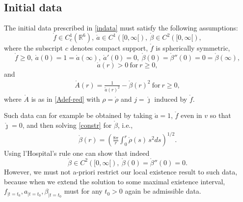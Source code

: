 \documentclass[11pt]{article}
\def\R{\mathbb R}
\begin{document}
\subsection{Initial data}\label{data}
%
%
The initial data prescribed in \eqref{indata} must satisfy the following
assumptions:
\[
\mathring{f} \in C^1_c (\R^6),\ 
\mathring{a}\in C^1([0,\infty[),\
\mathring{\beta}\in C^2([0,\infty[),
\]
where the subscript $c$ denotes compact support, $\mathring{f}$
is spherically symmetric,
\[
\mathring{f} \geq 0,\
\mathring{a}(0) = 1 = \mathring{a}(\infty),\  
\mathring{a}'(0) = 0,\
\mathring{\beta}(0) = \mathring{\beta}''(0) = 0 = \mathring{\beta}(\infty),
\]
\[
\mathring{a}(r) > 0\ \mbox{for}\ r\geq 0,
\]
and
\begin{align} \label{constr}
\mathring{A}(r)=\frac{1}{\mathring{a}(r)^2} -\mathring{\beta}(r)^2
\ \mbox{for}\ r\geq 0,
\end{align}
where $\mathring{A}$ is as in \eqref{Adef-red} with
$\rho=\mathring{\rho}$ and $j=\mathring{\jmath}$ induced by $\mathring{f}$.
%
\begin{remark}
  Such data can for example be obtained by taking $\mathring{a}=1$,
  $\mathring{f}$ even in $v$ so that $\mathring{\jmath}=0$,
  and then solving \eqref{constr} for $\mathring{\beta}$,
  i.e.,
  \begin{align} \label{beta0def}
  \mathring{\beta} (r)
  = \left(\frac{8\pi}{r}\int_0^r \mathring{\rho}(s)\,s^2 ds\right)^{1/2}.
  \end{align}
  Using l'Hospital's rule one can show that indeed
  \[
  \mathring{\beta}\in C^2([0,\infty[),
  \ \mathring{\beta}(0) = \mathring{\beta}''(0) =0.
  \]
  However, we must not a-priori restrict our local existence result
  to such data, because when we extend the solution to some maximal
  existence interval, $f_{|t=t_0}, a_{|t=t_0}, \beta_{|t=t_0}$
  must for any $t_0>0$ again be admissible data.
\end{remark}
%
%
\end{document}
